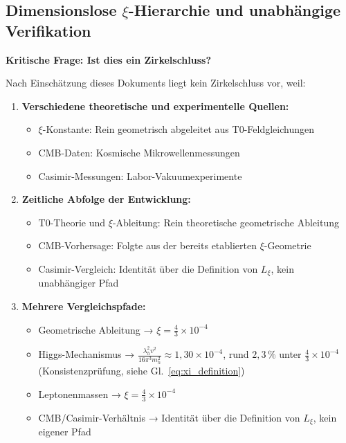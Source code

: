 	\subsection{Dimensionslose $\xi$-Hierarchie und unabhängige Verifikation}
	
	\textbf{Kritische Frage: Ist dies ein Zirkelschluss?}
	
	Nach Einschätzung dieses Dokuments liegt kein Zirkelschluss vor, weil:
	
	\begin{enumerate}
		\item \textbf{Verschiedene theoretische und experimentelle Quellen:}
		\begin{itemize}
			\item $\xi$-Konstante: Rein geometrisch abgeleitet aus T0-Feldgleichungen
			\item CMB-Daten: Kosmische Mikrowellenmessungen
			\item Casimir-Messungen: Labor-Vakuumexperimente
		\end{itemize}
		
		\item \textbf{Zeitliche Abfolge der Entwicklung:}
		\begin{itemize}
			\item T0-Theorie und $\xi$-Ableitung: Rein theoretische geometrische Ableitung
			\item CMB-Vorhersage: Folgte aus der bereits etablierten $\xi$-Geometrie
			\item Casimir-Vergleich: Identität über die Definition von $L_\xi$, kein unabhängiger Pfad
		\end{itemize}
		
		\item \textbf{Mehrere Vergleichspfade:}
		\begin{itemize}
			\item Geometrische Ableitung → $\xi = \frac{4}{3} \times 10^{-4}$
			\item Higgs-Mechanismus → $\frac{\lambda_h^2 v^2}{16\pi^3 m_h^2} \approx 1{,}30 \times 10^{-4}$, rund $2{,}3\,\%$ unter $\frac{4}{3} \times 10^{-4}$ (Konsistenzprüfung, siehe Gl.~\ref{eq:xi_definition})
			\item Leptonenmassen → $\xi = \frac{4}{3} \times 10^{-4}$
			\item CMB/Casimir-Verhältnis → Identität über die Definition von $L_\xi$, kein eigener Pfad
		\end{itemize}
	\end{enumerate}
	
